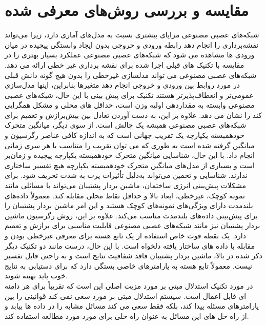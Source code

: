 \section{مقایسه و بررسی روش‌های معرفی شده}
شبکه‌های عصبی مصنوعی مزایای بیشتری نسبت به مدل‌های آماری دارد، زیرا می‌تواند نقشه‌برداری را انجام دهد
رابطه ورودی و خروجی بدون ایجاد وابستگی پیچیده
در میان ورودی ها مشاهده می شود که شبکه‌های عصبی مصنوعی عملکرد بسیار بهتری را در مقایسه با تکنیک های قبلی
 اجرا شده برای نقشه برداری غیر خطی ارائه می دهد. شبکه‌های عصبی مصنوعی می تواند مدلسازی غیرخطی را بدون هیچ گونه دانش قبلی در مورد روابط بین ورودی و خروجی انجام دهد
متغیرها بنابراین، اینها مدل‌سازی عمومی‌تر و انعطاف‌پذیرتر هستند
تکنیک برای پیش بینی با این حال، شبکه‌های عصبی مصنوعی وابسته به مقداردهی اولیه وزن است، حداقل های محلی و مشکل همگرایی کند را نشان می دهد. علاوه بر این،
 به دست آوردن تعادل
  بین بیش‌برازش و تعمیم برای
   شبکه‌های عصبی مصنوعی همیشه یک چالش است. از سوی دیگر، میانگین متحرک خودهمبسته یکپارچه یک تقریب جهانی است که به اندازه کافی عناصر رگرسیون و میانگین گرفته شده است  به طوری که می توان تقریب
  را متناسب با هر سری زمانی
  انجام داد. با این حال، شناسایی میانگین متحرک خودهمبسته یکپارچه پیچیده و زمان‌بر است و بسیاری از مدل‌های میانگین متحرک خودهمبسته یکپارچه هیچ تفسیر ساختاری ندارند. شناسایی و تخمین می‌تواند
   به‌دلیل تأثیرات پرت به شدت تحریف شود.
   برای مشکلات پیش‌بینی انرژی ساختمان، ماشین بردار پشتیبان می‌تواند با مسائلی مانند نمونه کوچک، غیرخطی، ابعاد بالا و حداقل نقاط محلی مقابله کند. 
   معمولاً داده‌های بلندمدت دارای ویژگی‌های نمونه‌های کوچک هستند و این امر ماشین بردار پشتیبان را برای پیش‌بینی داده‌های بلندمدت مناسب می‌کند.
    علاوه بر این، روش رگرسیون ماشین بردار پشتیبان نیز مانند شبکه‌های عصبی مصنوعی قابلیت مناسبی برای برازش و تعمیم دارد. یک نقطه قوت خاص استفاده از یک تابع هسته برای معرفی غیرخطی بودن
     و مقابله با داده های ساختار یافته دلخواه است. 
    با این حال، درست مانند دو تکنیک دیگر ذکر شده در بالا، ماشین بردار پشتیبان فاقد شفافیت نتایج است و به راحتی قابل تفسیر نیست. معمولاً تابع هسته به پارامترهای خاصی بستگی دارد
 که برای دستیابی به نتایج خوب باید بهینه شوند.
 \\
 در مورد تکنیک استدلال مبتی بر مورد مزیت اصلی این است که تقریباً برای هر دامنه ای قابل اعمال است. سیستم استدلال مبتی بر مورد سعی نمی کند قوانینی را بین پارامترهای مسئله پیدا کند،
  بلکه فقط سعی می کند مسائل مشابه را در داده ها بیابد 
 و از راه حل های این مسائل
  به عنوان راه حلی برای مورد مورد مطالعه استفاده کند. 
